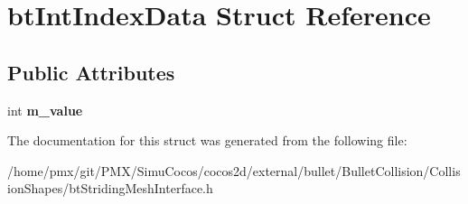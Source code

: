 \hypertarget{structbtIntIndexData}{}\section{bt\+Int\+Index\+Data Struct Reference}
\label{structbtIntIndexData}
\subsection*{Public Attributes}
\begin{DoxyCompactItemize}
\item 
\mbox{\label{structbtIntIndexData_afcfedba4aedfa132e0d3d4b206d334e8}} 
int {\bfseries m\+\_\+value}
\end{DoxyCompactItemize}


The documentation for this struct was generated from the following file\+:\begin{DoxyCompactItemize}
\item 
/home/pmx/git/\+P\+M\+X/\+Simu\+Cocos/cocos2d/external/bullet/\+Bullet\+Collision/\+Collision\+Shapes/bt\+Striding\+Mesh\+Interface.\+h\end{DoxyCompactItemize}
